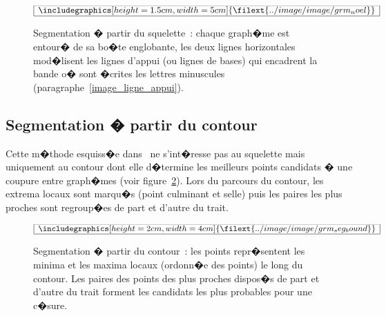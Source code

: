             \begin{figure}[ht]
        $$\frame{$\begin{array}[c]{c}\includegraphics[height=1.5cm, width=5cm]
        {\filext{../image/image/grm_noel}}\end{array}$}$$
        \caption{    Segmentation � partir du squelette~: 
                            chaque graph�me est entour� de sa bo�te englobante, les deux lignes horizontales
                            mod�lisent les lignes d'appui (ou lignes de bases) qui encadrent la bande o� 
                            sont �crites les lettres
                            minuscules (paragraphe~\ref{image_ligne_appui}).}
        \label{image_graphe_noel}
            \end{figure}







\subsection{Segmentation � partir du contour}
\label{image_sequence_graphem_contour}


Cette m�thode esquiss�e dans~ ne s'int�resse pas au squelette mais uniquement au contour dont elle d�termine les meilleurs points candidats � une coupure entre graph�mes (voir figure~\ref{image_segmentation_contour}). Lors du parcours du contour, les extrema locaux sont marqu�s (point culminant et selle) puis les paires les plus proches sont regroup�es de part et d'autre du trait.


            \begin{figure}[ht]
        $$\frame{$\begin{array}[c]{c}\includegraphics[height=2cm, width=4cm]
        {\filext{../image/image/grm_seg_bound}}\end{array}$}$$
        \caption{    Segmentation � partir du contour~: les points repr�sentent les minima et les maxima
                            locaux (ordonn�e des points) le long du contour. Les paires des points des plus
                            proches dispos�s de part et d'autre du trait
                            forment les candidats les plus probables pour une c�sure.
                            }
        \label{image_segmentation_contour}
            \end{figure}


